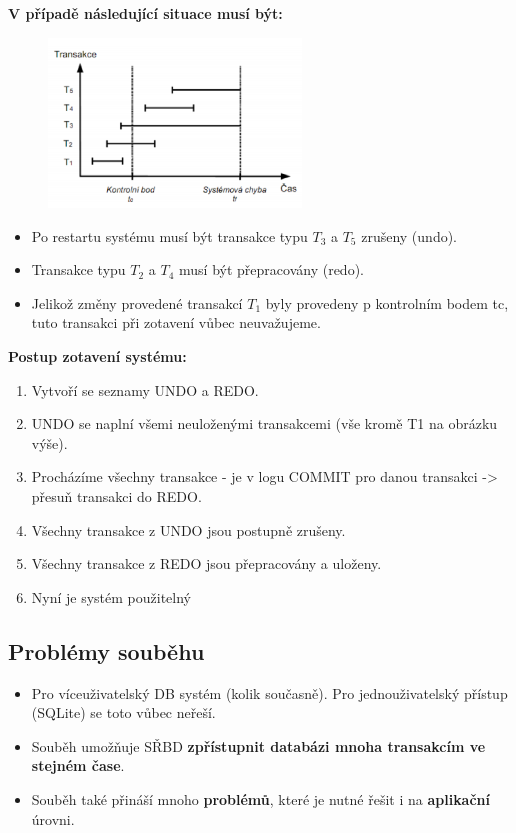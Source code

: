 \noindent \textbf{\noindent V případě následující situace musí být:}
\begin{figure}[H]
\centering
\includegraphics[width=0.6\textwidth]{assets/kontrolni_body.png}
\end{figure}

\begin{itemize}
\item Po restartu systému musí být transakce typu $ T_3 $ a $ T_5 $ zrušeny (undo).
\item Transakce typu $T_2$ a $T_4$ musí být přepracovány (redo).
\item Jelikož změny provedené transakcí $ T_1 $ byly provedeny p kontrolním bodem tc, tuto transakci při zotavení vůbec neuvažujeme.
\end{itemize}

\noindent \textbf{Postup zotavení systému:}
\begin{enumerate}
	\item Vytvoří se seznamy UNDO a REDO.
	\item UNDO se naplní všemi neuloženými transakcemi (vše kromě T1 na obrázku výše).
	\item Procházíme všechny transakce - je v logu COMMIT pro danou transakci -> přesuň transakci do REDO.
	\item Všechny transakce z UNDO jsou postupně zrušeny.
	\item Všechny transakce z REDO jsou přepracovány a uloženy.
	\item Nyní je systém použitelný
\end{enumerate}

\subsection{Problémy souběhu}
\begin{itemize}
\item Pro víceuživatelský DB systém (kolik současně). Pro jednouživatelský přístup (SQLite) se toto vůbec neřeší.
\item Souběh umožňuje SŘBD \textbf{zpřístupnit databázi mnoha transakcím ve stejném čase}.
\item Souběh také přináší mnoho \textbf{problémů}, které je nutné řešit i na \textbf{aplikační} úrovni.
\end{itemize}

